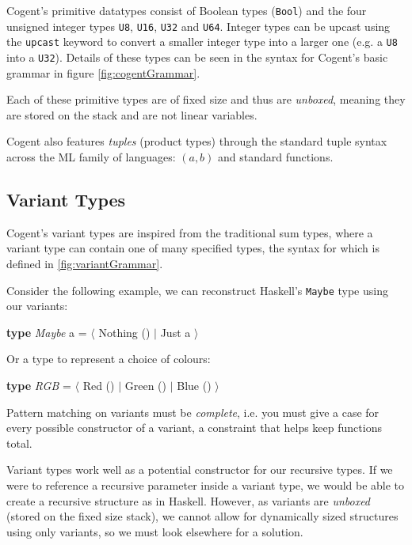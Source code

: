 Cogent's primitive datatypes consist of Boolean types (\texttt{Bool}) and the four unsigned integer types \texttt{U8}, 
\texttt{U16}, \texttt{U32} and \texttt{U64}. Integer types can be upcast using the \texttt{\textsf{upcast}}
keyword to convert a smaller integer type into a larger one (e.g. a \texttt{U8} into a \texttt{U32}).
Details of these types can be seen in the syntax for Cogent's basic grammar in figure \ref{fig:cogentGrammar}.

Each of these primitive types are of fixed size and thus are \emph{unboxed}, meaning they are stored on the
stack and are not linear variables.

Cogent also features \emph{tuples} (product types) through the standard tuple syntax across the ML
family of languages: $(a,b)$ and standard functions.

\subsection{Variant Types}

Cogent's variant types are inspired from the traditional sum types, where a variant type can contain
one of many specified types, the syntax for which is defined in \autoref{fig:variantGrammar}.

Consider the following example, we can reconstruct Haskell's \texttt{Maybe} type using our variants:

\begin{center}
    \textbf{type} \textit{Maybe} a = $\langle$ Nothing () $\vert$ Just a $\rangle$
\end{center}

Or a type to represent a choice of colours:

\begin{center}
    \textbf{type} \textit{RGB} = $\langle$ Red () $\vert$ Green () $\vert$ Blue () $\rangle$
\end{center}

Pattern matching on variants must be \textit{complete}, i.e. you must give a case for every possible constructor
of a variant, a constraint that helps keep functions total.

Variant types work well as a potential constructor for our recursive types. If we were to reference a
recursive parameter inside a variant type, we would be able to create a recursive structure as in Haskell.
However, as variants are \textit{unboxed} (stored on the fixed size stack), we cannot allow for dynamically sized structures
using only variants, so we must look elsewhere for a solution.


